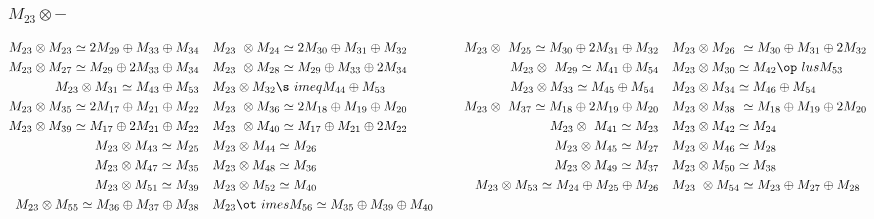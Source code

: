 \subsubsection{$M_23\otimes -$}
\begin{align*}
M_{23} \otimes M_{23} \simeq 2 M_{29} \oplus M_{33} \oplus M_{34} &&& M_{23} \
\otimes M_{24} \simeq 2 M_{30} \oplus M_{31} \oplus M_{32} &&& M_{23} \otimes \
M_{25} \simeq M_{30} \oplus 2 M_{31} \oplus M_{32} &&& M_{23} \otimes M_{26} \
\simeq M_{30} \oplus M_{31} \oplus 2 M_{32}\\
M_{23} \otimes M_{27} \simeq M_{29} \oplus 2 M_{33} \oplus M_{34} &&& M_{23} \
\otimes M_{28} \simeq M_{29} \oplus M_{33} \oplus 2 M_{34} &&& M_{23} \otimes \
M_{29} \simeq M_{41} \oplus M_{54} &&& M_{23} \otimes M_{30} \simeq M_{42} \op\
lus M_{53}\\
M_{23} \otimes M_{31} \simeq M_{43} \oplus M_{53} &&& M_{23} \otimes M_{32} \s\
imeq M_{44} \oplus M_{53} &&& M_{23} \otimes M_{33} \simeq M_{45} \oplus M_{54\
} &&& M_{23} \otimes M_{34} \simeq M_{46} \oplus M_{54}\\
M_{23} \otimes M_{35} \simeq 2 M_{17} \oplus M_{21} \oplus M_{22} &&& M_{23} \
\otimes M_{36} \simeq 2 M_{18} \oplus M_{19} \oplus M_{20} &&& M_{23} \otimes \
M_{37} \simeq M_{18} \oplus 2 M_{19} \oplus M_{20} &&& M_{23} \otimes M_{38} \
\simeq M_{18} \oplus M_{19} \oplus 2 M_{20}\\
M_{23} \otimes M_{39} \simeq M_{17} \oplus 2 M_{21} \oplus M_{22} &&& M_{23} \
\otimes M_{40} \simeq M_{17} \oplus M_{21} \oplus 2 M_{22} &&& M_{23} \otimes \
M_{41} \simeq M_{23} &&& M_{23} \otimes M_{42} \simeq M_{24}\\
M_{23} \otimes M_{43} \simeq M_{25} &&& M_{23} \otimes M_{44} \simeq M_{26} &&\
& M_{23} \otimes M_{45} \simeq M_{27} &&& M_{23} \otimes M_{46} \simeq M_{28}\
\\
M_{23} \otimes M_{47} \simeq M_{35} &&& M_{23} \otimes M_{48} \simeq M_{36} &&\
& M_{23} \otimes M_{49} \simeq M_{37} &&& M_{23} \otimes M_{50} \simeq M_{38}\
\\
M_{23} \otimes M_{51} \simeq M_{39} &&& M_{23} \otimes M_{52} \simeq M_{40} &&\
& M_{23} \otimes M_{53} \simeq M_{24} \oplus M_{25} \oplus M_{26} &&& M_{23} \
\otimes M_{54} \simeq M_{23} \oplus M_{27} \oplus M_{28}\\
M_{23} \otimes M_{55} \simeq M_{36} \oplus M_{37} \oplus M_{38} &&& M_{23} \ot\
imes M_{56} \simeq M_{35} \oplus M_{39} \oplus M_{40}\\
\end{align*}

